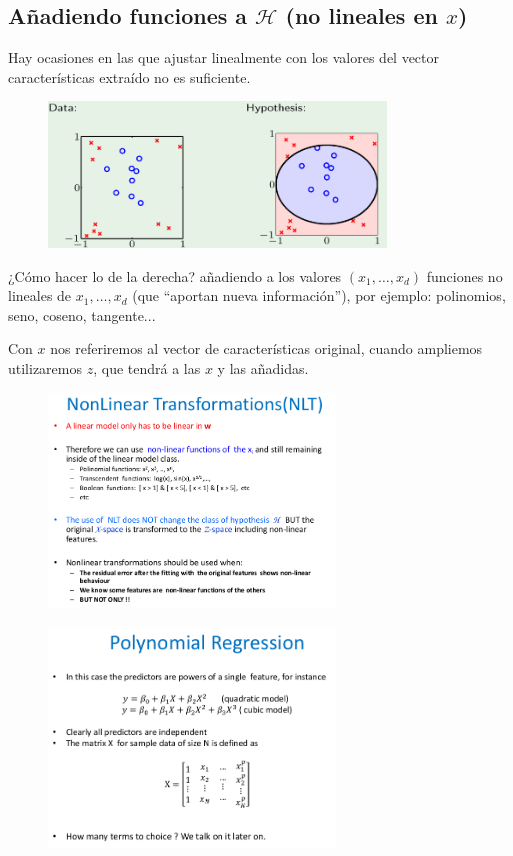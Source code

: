 \documentclass[11pt,a4paper]{article}
\theoremstyle{definition}
\begin{document}
	\subsection{Añadiendo funciones a $\mathcal{H}$ (no lineales en $x$)}
	Hay ocasiones en las que ajustar linealmente con los valores del vector características extraído no es suficiente. 
	\begin{figure}[H]
		\centering
		\includegraphics[width=0.8\textwidth]{images/linear_limited}
	\end{figure}
	¿Cómo hacer lo de la derecha? añadiendo a los valores $(x_1,\ldots,x_d)$ funciones no lineales de $x_1,\ldots,x_d$ (que ``aportan nueva información''), por ejemplo: polinomios, seno, coseno, tangente...
	
	Con $x$ nos referiremos al vector de características original, cuando ampliemos utilizaremos $z$, que tendrá a las $x$ y las añadidas.
	
	\begin{figure}[H]
		\centering
		\includegraphics[width=0.68\textwidth]{images/nlt}
	\end{figure}
		
	\begin{figure}[H]
		\centering
		\includegraphics[width=0.68\textwidth]{images/pol_reg_notlin}
	\end{figure}
	
\end{document}

